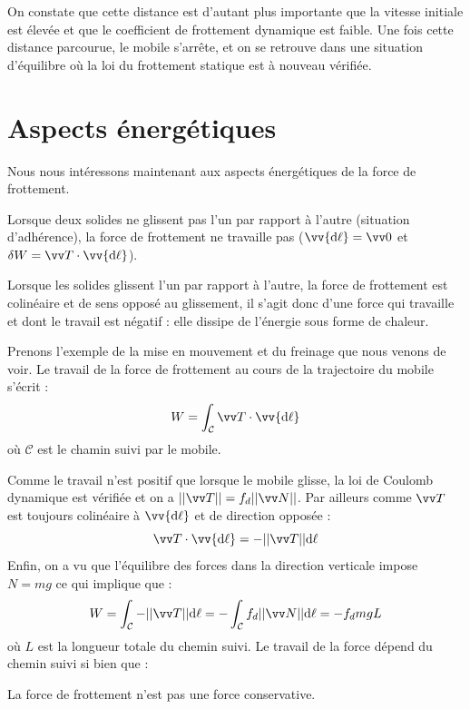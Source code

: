 \documentclass[11pt,fleqn]{book} %
\newcommand{\dd}{\mathrm{d}}
\begin{document}
On constate que cette distance est d'autant plus importante que la vitesse initiale est élevée et que le coefficient de frottement dynamique est faible. Une fois cette distance parcourue, le mobile s'arrête, et on se retrouve dans une situation d'équilibre où la loi du frottement statique est à nouveau vérifiée.

\section{Aspects énergétiques}

Nous nous intéressons maintenant aux aspects énergétiques de la force de frottement. 

Lorsque deux solides ne glissent pas l'un par rapport à l'autre (situation d'adhérence), la force de frottement ne travaille pas ($\vv{\dd \ell} = \vv 0$ et $\delta W = \vv T \cdot \vv{\dd \ell}$).

Lorsque les solides glissent l'un par rapport à l'autre, la force de frottement est colinéaire et de sens opposé au glissement, il s'agit donc d'une force qui travaille et dont le travail est négatif : elle dissipe de l'énergie sous forme de chaleur.

Prenons l'exemple de la mise en mouvement et du freinage que nous venons de voir. Le travail de la force de frottement au cours de la trajectoire du mobile s'écrit :
\begin{equation}
    W = \int_\mathcal{C} \vv T \cdot \vv{\dd \ell}
\end{equation}
où $\mathcal{C}$ est le chamin suivi par le mobile.

Comme le travail n'est positif que lorsque le mobile glisse, la loi de Coulomb dynamique est vérifiée et on a $|| \vv T|| = f_d || \vv N||$. Par ailleurs comme $\vv T$ est toujours colinéaire à $\vv{\dd \ell}$ et de direction opposée :
\begin{equation}
    \vv T \cdot \vv{\dd \ell} = - || \vv T|| \dd \ell
\end{equation}
Enfin, on a vu que l'équilibre des forces dans la direction verticale impose $N = mg$ ce qui implique que :
\begin{equation}
    W = \int_{\mathcal{C}} - || \vv T|| \dd \ell = - \int_{\mathcal{C}} f_d || \vv N|| \dd \ell = - f_d mg L
\end{equation}
où $L$ est la longueur totale du chemin suivi. Le travail de la force dépend du chemin suivi si bien que :

\begin{proposition}
    La force de frottement n'est pas une force conservative.
\end{proposition}
\end{document}

